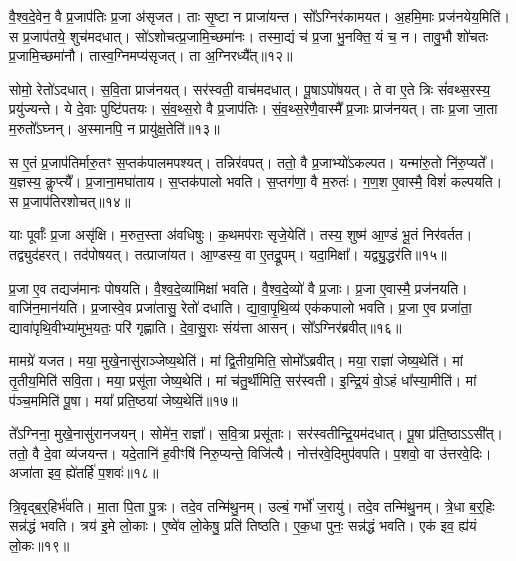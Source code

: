 वै॒श्व॒दे॒वेन॒ वै प्र॒जा\-प॑तिः प्र॒जा अ॑\-सृजत।
ताः सृ॒ष्टा न प्राजा॑यन्त।
सो᳚ऽग्निर॑कामयत।
अ॒हमि॒माः प्रज॑नयेय॒मिति॑।
स प्र॒जा\-प॑तये॒ शुच॑मदधात्।
सो॑ऽशोचत्प्र॒जामि॒च्छमा॑नः।
तस्मा॒द्यं च॑ प्र॒जा भु॒नक्ति॒ यं च॒ न।
तावु॒भौ शो॑चतः प्र॒जामि॒च्छमा॑नौ।
तास्व॒ग्निमप्य॑\-सृजत्।
ता अ॒ग्निरध्यै᳚त्॥१२॥\ip

सोमो॒ रेतो॑\-ऽदधात्।
स॒वि॒ता प्राज॑नयत्।
सर॑स्वती॒ वाच॑मदधात्।
पू॒षा\-ऽपो॑षयत्।
ते वा ए॒ते त्रिः सं॑वथ्स॒रस्य॒ प्रयु॑ज्यन्ते।
ये दे॒वाः पुष्टि॑पतयः।
सं॒व॒थ्स॒रो वै प्र॒जा\-प॑तिः।
सं॒व॒थ्स॒रेणै॒वास्मै᳚ प्र॒जाः प्राज॑नयत्।
ताः प्र॒जा जा॒ता म॒रुतो᳚\-ऽघ्नन्।
अ॒स्मानपि॒ न प्रायु॑क्ष॒तेति॑॥१३॥\ip

स ए॒तं प्र॒जा\-प॑तिर्मारु॒तꣳ स॒प्तक॑पालमपश्यत्।
तन्निर॑वपत्।
ततो॒ वै प्र॒जाभ्यो॑\-ऽकल्पत।
यन्मा॑रु॒तो नि॑रु॒प्यते᳚।
य॒ज्ञस्य॒ कॢप्त्यै᳚।
प्र॒जाना॒मघा॑ताय।
स॒प्तक॑पालो भवति।
स॒प्तग॑णा॒ वै म॒रुतः॑।
ग॒ण॒श ए॒वास्मै॒ विशं॑ कल्पयति।
स प्र॒जा\-प॑तिरशोचत्॥१४॥\ip

याः पूर्वाः᳚ प्र॒जा असृ॑क्षि।
म॒रुत॒स्ता अ॑वधिषुः।
क॒थमप॑राः सृजे॒येति॑।
तस्य॒ शुष्म॑ आ॒ण्डं भू॒तं निर॑वर्तत।
तद्व्युद॑हरत्।
तद॑पोषयत्।
तत्प्राजा॑यत।
आ॒ण्डस्य॒ वा ए॒तद्रू॒पम्।
यदा॒मिक्षा᳚।
यद्व्यु॒द्धर॑ति॥१५॥\ip

प्र॒जा ए॒व तद्यज॑मानः पोषयति।
वै॒श्व॒दे॒व्या॑मिक्षा॑ भवति।
वै॒श्व॒दे॒व्यो॑ वै प्र॒जाः।
प्र॒जा ए॒वास्मै॒ प्रज॑नयति।
वाजि॑न॒मान॑यति।
प्र॒जास्वे॒व प्रजा॑तासु॒ रेतो॑ दधाति।
द्या॒वा॒पृ॒थि॒व्य॑ एक॑कपालो भवति।
प्र॒जा ए॒व प्रजा॑ता॒ द्यावा॑पृथि॒वीभ्या॑मुभ॒यतः॒ परि॑ गृह्णाति।
दे॒वा॒सु॒राः संय॑त्ता आसन्।
सो᳚ऽग्निर॑ब्रवीत्॥१६॥\ip

मामग्रे॑ यजत।
मया॒ मुखे॒नासु॑राञ्जेष्य॒थेति॑।
मां द्वि॒तीय॒मिति॒ सोमो᳚\-ऽब्रवीत्।
मया॒ राज्ञा॑ जेष्य॒थेति॑।
मां तृ॒तीय॒मिति॑ सवि॒ता।
मया॒ प्रसू॑ता जेष्य॒थेति॑।
मां च॑तु॒र्थीमिति॒ सर॑स्वती।
इ॒न्द्रि॒यं वो॒ऽहं धा᳚स्या॒मीति॑।
मां प॑ञ्च॒ममिति॑ पू॒षा।
मया᳚ प्रति॒ष्ठया॑ जेष्य॒थेति॑॥१७॥\ip

ते᳚ऽग्निना॒ मुखे॒नासु॑रानजयन्।
सोमे॑न॒ राज्ञा᳚।
स॒वि॒त्रा प्रसू॑ताः।
सर॑स्वतीन्द्रि॒यम॑दधात्।
पू॒षा प्र॑ति॒ष्ठा\-ऽऽसी᳚त्।
ततो॒ वै दे॒वा व्य॑जयन्त।
यदे॒तानि॑ ह॒वीꣳषि॑ निरु॒प्यन्ते॒ विजि॑त्यै।
नोत्त॑रवे॒दिमुप॑वपति।
प॒शवो॒ वा उ॑त्तरवे॒दिः।
अजा॑ता इव॒ ह्ये॑तर्\mbox{}हि॑ प॒शवः॑॥१८॥\ip\anuvakamend[ऐ॒दित्य॑शोचद्व्यु॒द्धर॑त्यब्रवीत्प्रति॒ष्ठया॑ जेष्य॒थेत्ये॒तर्\mbox{}हि॑ प॒शवः॑]

त्रि॒वृद्ब॒र्॒हिर्भ॑वति।
मा॒ता पि॒ता पु॒त्रः।
तदे॒व तन्मि॑थु॒नम्।
उल्बं॒ गर्भो॑ ज॒रायु॑।
तदे॒व तन्मि॑थु॒नम्।
त्रे॒धा ब॒र्॒हिः सन्न॑द्धं भवति।
त्रय॑ इ॒मे लो॒काः।
ए॒ष्वे॑व लो॒केषु॒ प्रति॑ तिष्ठति।
ए॒क॒धा पुनः॒ सन्न॑द्धं भवति।
एक॑ इव॒ ह्य॑यं लो॒कः॥१९॥\ip

